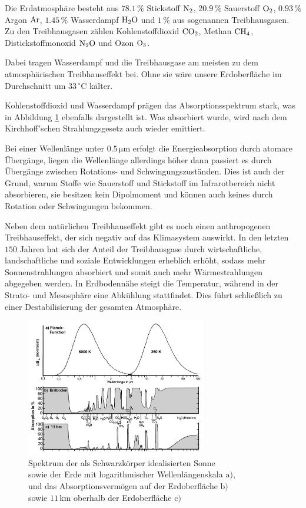 \documentclass[12pt,a4paper]{scrartcl}
\numberwithin{equation}{section} %
\begin{document}
Die Erdatmosphäre besteht aus $78.1\,\%$ Stickstoff $\ce{N_2}$, $20.9\,\%$ Sauerstoff $\ce{O_2}$, $0.93\,\%$ Argon $\ce{Ar}$, $1.45\,\%$ Wasserdampf $\ce{H_2O}$ und $1\,\%$ aus sogenannen Treibhausgasen. Zu den Treibhausgasen zählen Kohlenstoffdioxid $\ce{CO_2}$, Methan $\ce{CH_4}$, Distickstoffmonoxid $\ce{N_2O}$ und Ozon $\ce{O_3}$.

Dabei tragen Wasserdampf und die Treibhausgase am meisten zu dem atmosphärischen Treibhauseffekt bei. Ohne sie wäre unsere Erdoberfläche im Durchschnitt um $33\mathrm{\,^\circ C}$ kälter. \cite{BakanRaschke}

Kohlenstoffdioxid und Wasserdampf prägen das Absorptionsspektrum stark, was in Abbildung \ref{abb:Spektrum Sonne & Erde} ebenfalls dargestellt ist. Was absorbiert wurde, wird nach dem Kirchhoff'schen Strahlungsgesetz auch wieder emittiert.

Bei einer Wellenlänge unter $0.5\mathrm{\,\mu m}$ erfolgt die Energieabsorption durch atomare Übergänge, liegen die Wellenlänge allerdings höher dann passiert es durch Übergänge zwischen Rotations- und Schwingungszuständen. Dies ist auch der Grund, warum Stoffe wie Sauerstoff und Stickstoff im Infrarotbereich nicht absorbieren, sie besitzen kein Dipolmoment und können auch keines durch Rotation oder Schwingungen bekommen. \cite{BakanRaschke}

Neben dem natürlichen Treibhauseffekt gibt es noch einen anthropogenen Treibhauseffekt, der sich negativ auf das Klimasystem auswirkt. In den letzten $150$ Jahren hat sich der Anteil der Treibhausgase durch wirtschaftliche, landschaftliche und soziale Entwicklungen erheblich erhöht, sodass mehr Sonnenstrahlungen absorbiert und somit auch mehr Wärmestrahlungen abgegeben werden. In Erdbodennähe steigt die Temperatur, während in der Strato- und Mesosphäre eine Abkühlung stattfindet. Dies führt schließlich zu einer Destabilisierung der gesamten Atmosphäre. \cite{BakanRaschke}

\begin{figure}[h!]
  \centering
  \includegraphics[width=0.7\textwidth]{../media/B1.1/Spektrum_Sonne_Erde.png}
  \caption{Spektrum der als Schwarzkörper idealisierten Sonne\\
    sowie der Erde mit logarithmischer Wellenlängenskala $\mathrm a)$,\\
    und das Absorptionsvermögen auf der Erdoberfläche $\mathrm b)$\\
    sowie $11\mathrm{\,km}$ oberhalb der Erdoberfläche $\mathrm c)$ \cite{GoodyYung}}
  \label{abb:Spektrum Sonne & Erde}
\end{figure}
\end{document}
